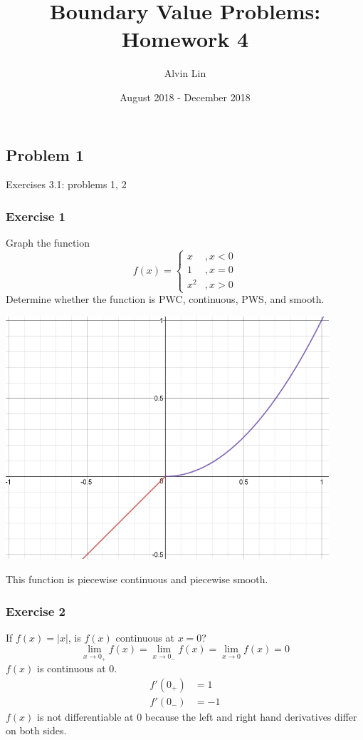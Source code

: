 \documentclass{math}
\title{Boundary Value Problems: Homework 4}
\author{Alvin Lin}
\date{August 2018 - December 2018}
\begin{document}
\maketitle

\subsection*{Problem 1}
Exercises 3.1: problems 1, 2

\subsubsection*{Exercise 1}
Graph the function
\[ f(x) = \begin{cases}
  x &, x<0 \\
  1 &, x=0 \\
  x^2 &, x>0
\end{cases} \]
Determine whether the function is PWC, continuous, PWS, and smooth.
\begin{center}
  \includegraphics[width=12cm]{assets/hw_04_graph.png}
\end{center}
This function is piecewise continuous and piecewise smooth.

\subsubsection*{Exercise 2}
If \( f(x) = |x| \), is \( f(x) \) continuous at \( x = 0 \)?
\[ \lim_{x\to0_+}f(x) = \lim_{x\to0_-}f(x) = \lim_{x\to0}f(x) = 0 \]
\( f(x) \) is continuous at 0.
\begin{align*}
  f'(0_+) &= 1 \\
  f'(0_-) &= -1
\end{align*}
\( f(x) \) is not differentiable at 0 because the left and right hand
derivatives differ on both sides.
\end{document}
